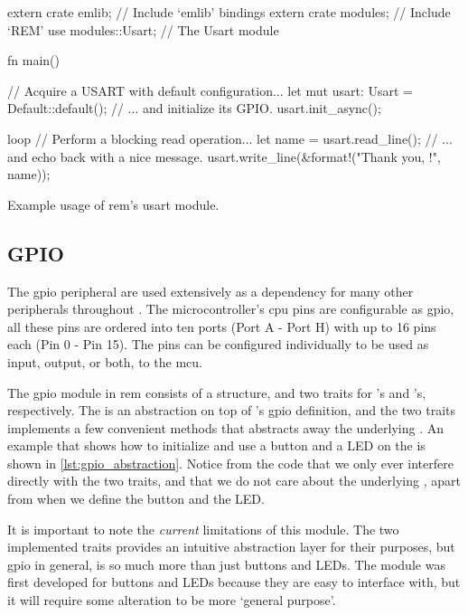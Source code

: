 \begin{listing}[H]
  \begin{rustcode}
extern crate emlib;   // Include `emlib' bindings
extern crate modules; // Include `REM'
use modules::Usart;   // The Usart module

fn main() {
  // Acquire a USART with default configuration...
  let mut usart: Usart = Default::default();
  // ... and initialize its GPIO.
  usart.init_async();

  loop {
    // Perform a blocking read operation...
    let name = usart.read_line();
    // ... and echo back with a nice message.
    usart.write_line(&format!("Thank you, {}!", name));
  }
}
  \end{rustcode}
  \caption{Example usage of \gls{rem}'s \gls{usart} module.}
  \label{lst:usart_abstraction}
\end{listing}

\subsection{GPIO} %
\label{ssub:gpio}

The \gls{gpio} peripheral are used extensively as a dependency for many other peripherals throughout {\emlib}.
The microcontroller's \gls{cpu} pins are configurable as \gls{gpio}, all these pins are ordered into ten ports (Port A - Port H) with up to 16 pins each (Pin 0 - Pin 15).
The pins can be configured individually to be used as input, output, or both, to the \gls{mcu}.

The \gls{gpio} module in \gls{rem} consists of a  structure, and two traits for 's and 's, respectively.
The  is an abstraction on top of {\emlib}'s \gls{gpio} definition, and the two traits implements a few convenient methods that abstracts away the underlying .
An example that shows how to initialize and use a button and a LED on the {\STK} is shown in \autoref{lst:gpio_abstraction}.
Notice from the code that we only ever interfere directly with the two traits, and that we do not care about the underlying , apart from when we define the button and the LED.

It is important to note the \emph{current} limitations of this module.
The two implemented traits provides an intuitive abstraction layer for their purposes, but \gls{gpio} in general, is so much more than just buttons and LEDs.
The module was first developed for buttons and LEDs because they are easy to interface with, but it will require some alteration to be more `general purpose'.

